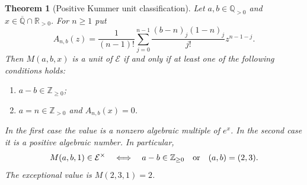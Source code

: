\documentclass[11pt,a4paper]{article}
\newtheorem{theorem}{Theorem}[section]
\theoremstyle{definition}
\theoremstyle{remark}
\numberwithin{equation}{section}
\begin{document}
\begin{theorem}[Positive Kummer unit classification]
\label{p2:thm:positive-kummer-units}
Let $a,b\in\mathbb Q_{>0}$ and
$x\in\overline{\mathbb Q}\cap\mathbb R_{>0}$.  For $n\ge1$ put
\[
 A_{n,b}(z)=\frac1{(n-1)!}
  \sum_{j=0}^{n-1}
  \frac{(b-n)_j(1-n)_j}{j!}z^{n-1-j}.
\]
Then $M(a,b,x)$ is a unit of $\mathcal E$ if and only if at least one
of the following conditions holds:
\begin{enumerate}
\item $a-b\in\mathbb Z_{\ge0}$;
\item $a=n\in\mathbb Z_{>0}$ and $A_{n,b}(x)=0$.
\end{enumerate}
In the first case the value is a nonzero algebraic multiple of $e^x$.
In the second case it is a positive algebraic number.
In particular,
\[
 M(a,b,1)\in\mathcal E^\times
 \quad\Longleftrightarrow\quad
 a-b\in\mathbb Z_{\ge0}\quad\hbox{or}\quad(a,b)=(2,3).
\]
The exceptional value is $M(2,3,1)=2$.
\end{theorem}
\end{document}

